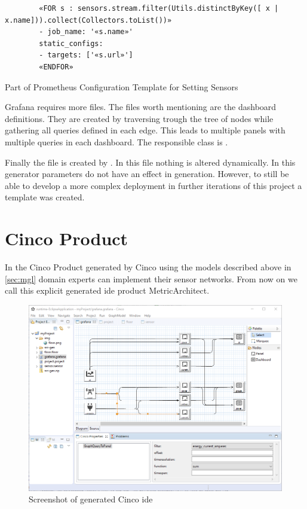 \begin{listing}
	\begin{verbatim}
		«FOR s : sensors.stream.filter(Utils.distinctByKey([ x | x.name])).collect(Collectors.toList())»
		- job_name: '«s.name»'
		static_configs:
		- targets: ['«s.url»']
		«ENDFOR»
	\end{verbatim}
	\caption{Part of Prometheus Configuration Template for Setting Sensors}
	\label{lst:xtend_prom}
\end{listing} 

Grafana requires more files. The files worth mentioning are the dashboard definitions. They are created by traversing trough the tree of nodes while gathering all queries defined in each  edge. This leads to multiple panels with multiple queries in each dashboard. The responsible class is .

Finally the  file is created by . In this file nothing is altered dynamically. In this generator parameters do not have an effect in generation. However, to still be able to develop a more complex deployment in further iterations of this project a template was created.

\section{Cinco Product}

In the Cinco Product generated by Cinco using the models described above in \cref{sec:mgl} domain experts can implement their sensor networks. From now on we call this explicit generated \gls{ide} product MetricArchitect. 

\begin{figure}
	\includegraphics[width=\textwidth]{assets/images/editor}
	\caption{Screenshot of generated Cinco \gls{ide}}
	\label{fig:editor}
\end{figure}

